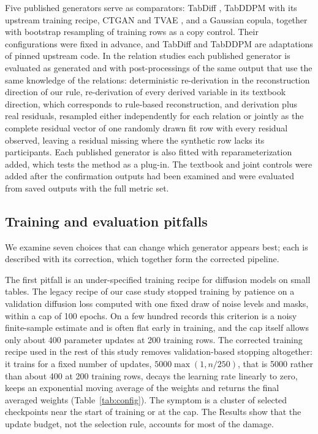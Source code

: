 \documentclass[pdflatex,referee]{sn-jnl}%
\begin{document}
Five published generators serve as comparators: TabDiff \cite{shi2025tabdiff}, TabDDPM \cite{kotelnikov2023tabddpm} with its upstream training recipe, CTGAN and TVAE \cite{xu2019ctgan}, and a Gaussian copula, together with bootstrap resampling of training rows as a copy control. Their configurations were fixed in advance, and TabDiff and TabDDPM are adaptations of pinned upstream code. In the relation studies each published generator is evaluated as generated and with post-processings of the same output that use the same knowledge of the relations: deterministic re-derivation in the reconstruction direction of our rule, re-derivation of every derived variable in its textbook direction, which corresponds to rule-based reconstruction, and derivation plus real residuals, resampled either independently for each relation or jointly as the complete residual vector of one randomly drawn fit row with every residual observed, leaving a residual missing where the synthetic row lacks its participants. Each published generator is also fitted with reparameterization added, which tests the method as a plug-in. The textbook and joint controls were added after the confirmation outputs had been examined and were evaluated from saved outputs with the full metric set.

\subsection*{Training and evaluation pitfalls}

We examine seven choices that can change which generator appears best; each is described with its correction, which together form the corrected pipeline.

The first pitfall is an under-specified training recipe for diffusion models on small tables. The legacy recipe of our case study stopped training by patience on a validation diffusion loss computed with one fixed draw of noise levels and masks, within a cap of 100 epochs. On a few hundred records this criterion is a noisy finite-sample estimate and is often flat early in training, and the cap itself allows only about 400 parameter updates at 200 training rows. The corrected training recipe used in the rest of this study removes validation-based stopping altogether: it trains for a fixed number of updates, $5000 \max(1, n/250)$, that is 5000 rather than about 400 at 200 training rows, decays the learning rate linearly to zero, keeps an exponential moving average of the weights and returns the final averaged weights (Table~\ref{tab:config}). The symptom is a cluster of selected checkpoints near the start of training or at the cap. The Results show that the update budget, not the selection rule, accounts for most of the damage.
\end{document}
